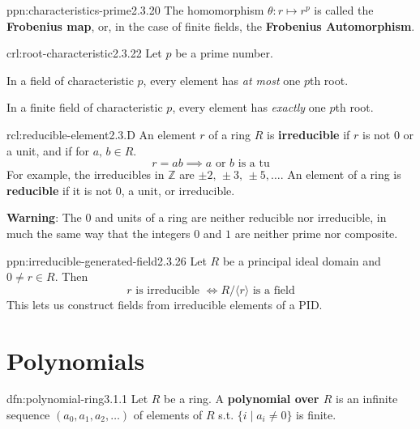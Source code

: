\documentclass[landscape, 8pt]{extarticle}
\begin{document}
\begin{multicols}{3}
\begin{ppn}{ppn:characteristics-prime}{2.3.20}
    \longrule{0.08ex}
    The homomorphism $\theta : r \mapsto r^{p}$ is called the \textbf{Frobenius map}, or, in the case of finite fields, the \textbf{Frobenius Automorphism}.
\end{ppn}

\begin{crl}{crl:root-characteristic}{2.3.22}
    Let $p$ be a prime number.
    \begin{enumerate-tight}
        \item In a field of characteristic $p$, every element has \textit{at most} one $p$th root.
        \item In a finite field of characteristic $p$, every element has \textit{exactly} one $p$th root.
    \end{enumerate-tight}
\end{crl}


\begin{rcl}{rcl:reducible-element}{2.3.D}
    An element $r$ of a ring $R$ is \textbf{irreducible} if $r$ is not $0$ or a unit, and if for $a,\,b\in R$.
    \[r = ab \implies a \text{ or } b \text{ is a tu}\]
    For example, the irreducibles in $\mathbb{Z}$ are $\pm 2,\,\pm 3,\,\pm 5,\dots$. An element of a ring is \textbf{reducible} if it is not $0$, a unit, or irreducible.

    \longrule{0.08ex}
    \textbf{Warning}: The $0$ and units of a ring are neither reducible nor irreducible, in much the same way that the integers $0$ and $1$ are neither prime nor composite.
\end{rcl}

\newpage

\begin{ppn}[]{ppn:irreducible-generated-field}{2.3.26}
    Let $R$ be a principal ideal domain and $0 \ne r \in R$. Then
    \[r \text{ is irreducible } \iff R / \langle r \rangle \text{ is a field}\]
    This lets us construct fields from irreducible elements of a PID.
\end{ppn}

\section{Polynomials}

\begin{dfn}{dfn:polynomial-ring}{3.1.1}
    Let $R$ be a ring. A \textbf{polynomial over $R$} is an infinite sequence $(a_{0},a_{1},a_{2},\dots)$ of elements of $R$ s.t. $\{i \mid a_{i} \ne 0\}$ is finite.


\end{dfn}
\end{multicols}
\end{document}
